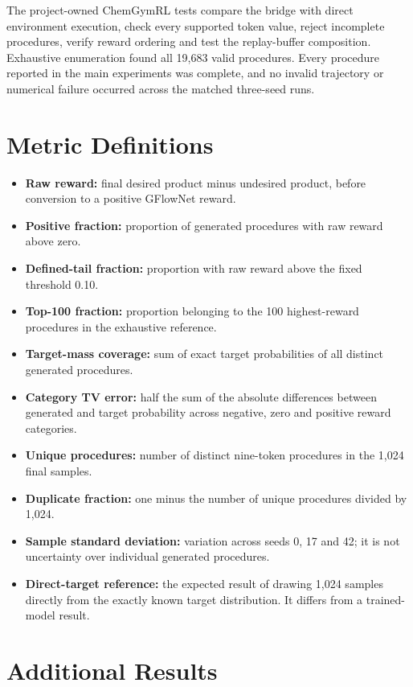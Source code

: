 \documentclass{article}
\begin{document}
The project-owned ChemGymRL tests compare the bridge with direct environment execution, check every supported token value, reject incomplete procedures, verify reward ordering and test the replay-buffer composition. Exhaustive enumeration found all 19,683 valid procedures. Every procedure reported in the main experiments was complete, and no invalid trajectory or numerical failure occurred across the matched three-seed runs.

\section{Metric Definitions}
\label{app:metrics}

\begin{itemize}
    \item \textbf{Raw reward:} final desired product minus undesired product, before conversion to a positive GFlowNet reward.
    \item \textbf{Positive fraction:} proportion of generated procedures with raw reward above zero.
    \item \textbf{Defined-tail fraction:} proportion with raw reward above the fixed threshold 0.10.
    \item \textbf{Top-100 fraction:} proportion belonging to the 100 highest-reward procedures in the exhaustive reference.
    \item \textbf{Target-mass coverage:} sum of exact target probabilities of all distinct generated procedures.
    \item \textbf{Category TV error:} half the sum of the absolute differences between generated and target probability across negative, zero and positive reward categories.
    \item \textbf{Unique procedures:} number of distinct nine-token procedures in the 1,024 final samples.
    \item \textbf{Duplicate fraction:} one minus the number of unique procedures divided by 1,024.
    \item \textbf{Sample standard deviation:} variation across seeds 0, 17 and 42; it is not uncertainty over individual generated procedures.
    \item \textbf{Direct-target reference:} the expected result of drawing 1,024 samples directly from the exactly known target distribution. It differs from a trained-model result.
\end{itemize}

\section{Additional Results}
\label{app:additional-results}
\end{document}
